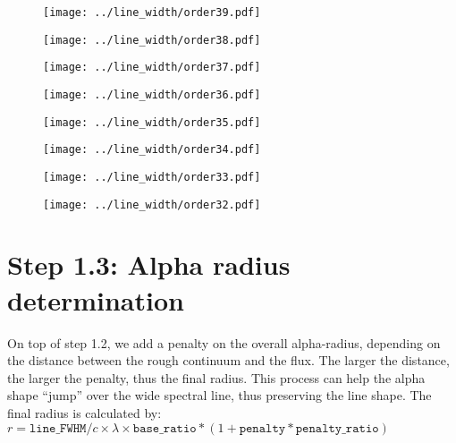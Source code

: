 \documentclass{article}
\begin{document}
\begin{figure}[H]
    \centering
    \texttt{[image: ../line\_width/order39.pdf]}
\end{figure}
\begin{figure}[H]
    \centering
    \texttt{[image: ../line\_width/order38.pdf]}
\end{figure}
\begin{figure}[H]
    \centering
    \texttt{[image: ../line\_width/order37.pdf]}
\end{figure}
\begin{figure}[H]
    \centering
    \texttt{[image: ../line\_width/order36.pdf]}
\end{figure}
\begin{figure}[H]
    \centering
    \texttt{[image: ../line\_width/order35.pdf]}
\end{figure}
\begin{figure}[H]
    \centering
    \texttt{[image: ../line\_width/order34.pdf]}
\end{figure}
\begin{figure}[H]
    \centering
    \texttt{[image: ../line\_width/order33.pdf]}
\end{figure}
\begin{figure}[H]
    \centering
    \texttt{[image: ../line\_width/order32.pdf]}
\end{figure}

\newpage

\section{Step 1.3: Alpha radius determination}

On top of step 1.2, we add a penalty on the overall alpha-radius, depending on the distance between the rough continuum and the flux. 
The larger the distance, the larger the penalty, thus the final radius. 
This process can help the alpha shape ``jump'' over the wide spectral line, thus preserving the line shape.
The final radius is calculated by: $r = \texttt{line\_FWHM} / c \times \lambda \times \texttt{base\_ratio} * (1 + \texttt{penalty} * \texttt{penalty\_ratio})$
\end{document}
